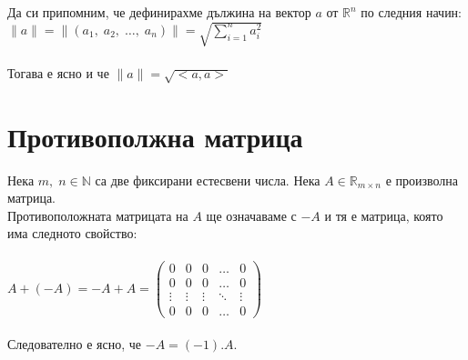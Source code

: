 \documentclass[12pt]{article}
\newcommand{\N}{\mathbb{N}}
\newcommand{\R}{\mathbb{R}}
\begin{document}
Да си припомним, че дефинирахме дължина на вектор $a$ от $\R^n$ по следния начин: \\

$\|a\| = \|(a_1, \; a_2, \; \dots, \; a_n)\| = \displaystyle\sqrt{\displaystyle\sum_{i = 1}^n a_i^2}$ \\\\

Тогава е ясно и че $\|a\| = \sqrt{<a, a>}$

\section*{Противополжна матрица}

Нека $m, \; n \in \N$ са две фиксирани естесвени числа. Нека $A \in \R_{m \times n}$ е произволна матрица. \\

Противоположната матрицата на $A$ ще означаваме с $-A$ и тя е матрица, която има следното свойство: \\\\

$A + (-A) = -A + A = \begin{pmatrix}
    0 & 0 & 0 & \dots  & 0 \\
    0 & 0 & 0 & \dots  & 0 \\
    \vdots & \vdots & \vdots & \ddots & \vdots \\
    0 & 0 & 0 & \dots  & 0
\end{pmatrix}$ \\\\

Следователно е ясно, че $-A = (-1).A$.
\end{document}

